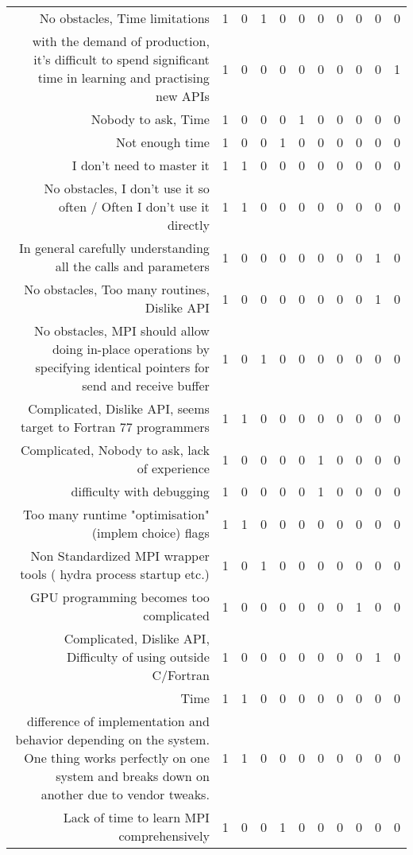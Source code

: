 {\begin{landscape}
\begin{longtable}[htb]{r|c|c|c|c|c|c|c|c|c|c}
{No obstacles, Time limitations} & 1 & 0 & 1 & 0 & 0 & 0 & 0 & 0 & 0 & 0 \\%
{with the demand of production, it's difficult to spend significant time in learning and practising new APIs} & 1 & 0 & 0 & 0 & 0 & 0 & 0 & 0 & 0 & 1 \\%
{Nobody to ask, Time} & 1 & 0 & 0 & 0 & 1 & 0 & 0 & 0 & 0 & 0 \\%
{Not enough time} & 1 & 0 & 0 & 1 & 0 & 0 & 0 & 0 & 0 & 0 \\%
{I don't need to master it} & 1 & 1 & 0 & 0 & 0 & 0 & 0 & 0 & 0 & 0 \\%
{No obstacles, I don't use it so often / Often I don't use it directly} & 1 & 1 & 0 & 0 & 0 & 0 & 0 & 0 & 0 & 0 \\%
{In general carefully understanding all the calls and parameters} & 1 & 0 & 0 & 0 & 0 & 0 & 0 & 0 & 1 & 0 \\%
{No obstacles, Too many routines, Dislike API} & 1 & 0 & 0 & 0 & 0 & 0 & 0 & 0 & 1 & 0 \\%
{No obstacles, MPI should allow doing in-place operations by specifying identical pointers for send and receive buffer} & 1 & 0 & 1 & 0 & 0 & 0 & 0 & 0 & 0 & 0 \\%
{Complicated, Dislike API, seems target to Fortran 77 programmers} & 1 & 1 & 0 & 0 & 0 & 0 & 0 & 0 & 0 & 0 \\%
{Complicated, Nobody to ask, lack of experience} & 1 & 0 & 0 & 0 & 0 & 1 & 0 & 0 & 0 & 0 \\%
{difficulty with debugging} & 1 & 0 & 0 & 0 & 0 & 1 & 0 & 0 & 0 & 0 \\%
{Too many runtime "optimisation" (implem choice) flags} & 1 & 1 & 0 & 0 & 0 & 0 & 0 & 0 & 0 & 0 \\%
{Non  Standardized MPI wrapper tools ( hydra process startup etc.)} & 1 & 0 & 1 & 0 & 0 & 0 & 0 & 0 & 0 & 0 \\%
{GPU programming becomes too complicated} & 1 & 0 & 0 & 0 & 0 & 0 & 0 & 1 & 0 & 0 \\%
{Complicated, Dislike API, Difficulty of using outside C/Fortran} & 1 & 0 & 0 & 0 & 0 & 0 & 0 & 0 & 1 & 0 \\%
{Time} & 1 & 1 & 0 & 0 & 0 & 0 & 0 & 0 & 0 & 0 \\%
{difference of implementation and behavior depending on the system. One thing works perfectly on one system and breaks down on another due to vendor tweaks.} & 1 & 1 & 0 & 0 & 0 & 0 & 0 & 0 & 0 & 0 \\%
{Lack of time to learn MPI comprehensively} & 1 & 0 & 0 & 1 & 0 & 0 & 0 & 0 & 0 & 0 \\%

\end{longtable}
\end{landscape}}
